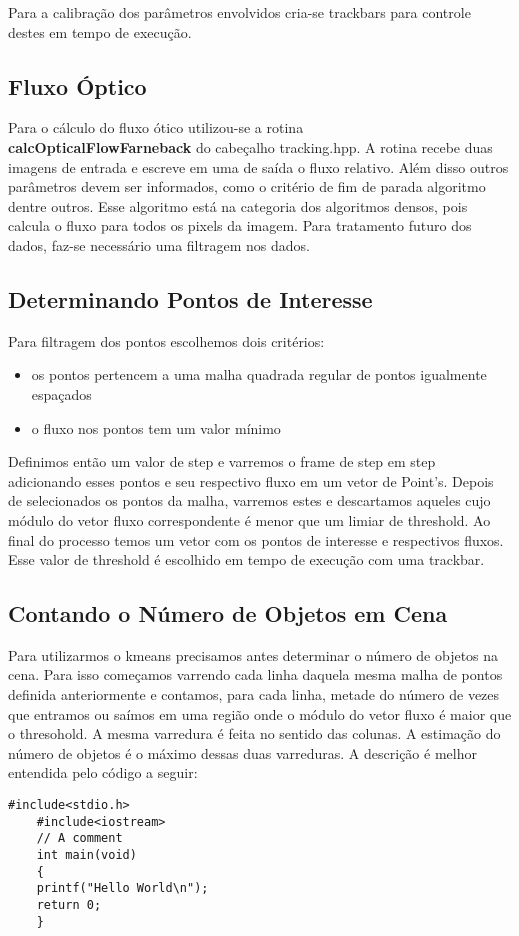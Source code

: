 \documentclass[journal]{IEEEtran}
\begin{document}
Para a calibração dos parâmetros envolvidos cria-se trackbars para 
controle destes em tempo de execução.

\newpage 
\subsection{Fluxo Óptico}

Para o cálculo do fluxo ótico utilizou-se a rotina \\ 
\textbf{calcOpticalFlowFarneback} do cabeçalho tracking.hpp. A rotina
recebe duas imagens de entrada e escreve em uma de saída o fluxo 
relativo. Além disso outros parâmetros devem ser informados, como o 
critério de fim de parada algoritmo dentre outros. Esse algoritmo 
está na categoria dos algoritmos densos, pois calcula o fluxo para 
todos os pixels da imagem. Para tratamento futuro dos dados, faz-se 
necessário uma filtragem nos dados.

\subsection{Determinando Pontos de Interesse}
Para filtragem dos pontos escolhemos dois critérios:
\begin{itemize}
 \item os pontos pertencem a uma malha quadrada regular de pontos 
igualmente espaçados
  \item o fluxo nos pontos tem um valor mínimo
\end{itemize}
Definimos então um valor de step e varremos o frame de step em step 
adicionando esses pontos e seu respectivo fluxo em um vetor de 
Point's. Depois de selecionados os pontos da malha, varremos estes e 
descartamos aqueles cujo módulo do vetor fluxo correspondente é menor 
que um limiar de threshold. Ao final do processo temos um vetor com 
os pontos de interesse e respectivos fluxos. Esse valor de threshold 
é escolhido em tempo de execução com uma trackbar.

\subsection{Contando o Número de Objetos em Cena}
Para utilizarmos o kmeans precisamos antes determinar o número de 
objetos na cena. Para isso começamos varrendo cada linha daquela 
mesma malha de pontos definida anteriormente e contamos, para cada 
linha, metade do número de vezes que entramos ou saímos em uma região 
onde o módulo do vetor fluxo é maior que o thresohold. A mesma 
varredura é feita no sentido das colunas. A estimação do 
número de objetos é o máximo dessas duas varreduras. A descrição é 
melhor entendida pelo código a seguir:
\begin{lstlisting}[frame = single ]
    #include<stdio.h>
    #include<iostream>
    // A comment
    int main(void)
    {
    printf("Hello World\n");
    return 0;
    }
\end{lstlisting}
\end{document}
